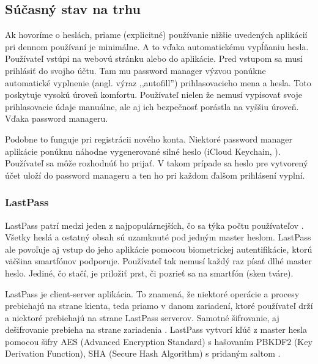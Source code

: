 \subsection{Súčasný stav na trhu} \label{sucasnystavnatrhu}
Ak hovoríme o heslách, priame (explicitné) používanie nižšie uvedených aplikácií pri dennom používaní je minimálne. A to vďaka automatickému vypĺňaniu hesla. Používateľ vstúpi na webovú stránku alebo do aplikácie. Pred vstupom sa musí prihlásiť do svojho účtu. Tam mu password manager výzvou ponúkne automatické vyplnenie (angl. výraz ,,autofill'') prihlasovacieho mena a hesla. Toto poskytuje vysokú úroveň komfortu. Používateľ nielen že nemusí vypisovať svoje prihlasovacie údaje manuálne, ale aj ich bezpečnosť porástla na vyššiu úroveň. Vďaka password manageru.

Podobne to funguje pri registrácii nového konta. Niektoré password manager aplikácie ponúknu náhodne vygenerované silné heslo (iCloud Keychain, \cite{icloud_keychain}). Používateľ sa môže rozhodnúť ho prijať. V takom prípade sa heslo pre vytvorený účet uloží do password manageru a ten ho pri každom ďalšom prihlásení vyplní. 
\subsubsection{LastPass} 
LastPass patrí medzi jeden z najpopulárnejších, čo sa týka počtu používateľov \cite{10years_lastpass}. Všetky heslá a ostatný obsah sú uzamknuté pod jedným master heslom. LastPass ale povoľuje aj vstup do jeho aplikácie pomocou biometrickej autentifikácie, ktorú väčšina smartfónov podporuje. Používateľ tak nemusí každý raz písať dlhé master heslo. Jediné, čo stačí, je priložiť prst, či pozrieť sa na smartfón (sken tváre). 

LastPass je client-server aplikácia. To znamená, že niektoré operácie a procesy prebiehajú na strane kienta, teda priamo v danom zariadení, ktoré používateľ drží a niektoré prebiehajú na strane LastPass serverov. Samotné šifrovanie, aj dešifrovanie prebieha na strane zariadenia \cite{how_lastpass_works}. LastPass vytvorí kľúč z master hesla pomocou šifry AES (Advanced Encryption Standard) s hašovaním PBKDF2 (Key Derivation Function), SHA (Secure Hash Algorithm) s pridaným saltom \cite{lastpass_features}.

